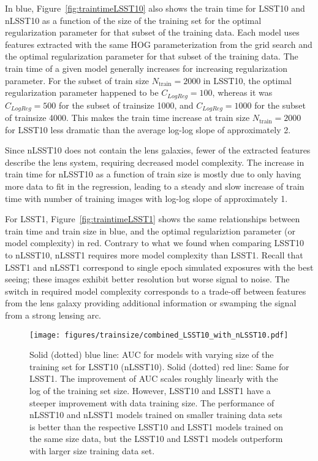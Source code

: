 \documentclass{emulateapj}
\begin{document}
In blue, Figure~\ref{fig:traintimeLSST10} also shows the train time
for LSST10 and nLSST10 as a function of the size of the training set
for the optimal regularization parameter for that subset of the
training data.  Each model uses features extracted with the same HOG
parameterization from the grid search and the optimal regularization
parameter for that subset of the training data.  The train time of a
given model generally increases for increasing regularization
parameter.  For the subset of train size $N_\text{train}=2000$ in
LSST10, the optimal regularization parameter happened to be
$C_{LogReg}=100$, whereas it was $C_{LogReg}=500$ for the subset of
trainsize 1000, and $C_{LogReg}=1000$ for the subset of trainsize
4000.  This makes the train time increase at train size
$N_\text{train}=2000$ for LSST10 less dramatic than the average
log-log slope of approximately 2.

Since nLSST10 does not contain the lens galaxies, fewer of the
extracted features describe the lens system, requiring decreased model
complexity.  The increase in train time for nLSST10 as a function of
train size is mostly due to only having more data to fit in the
regression, leading to a steady and slow increase of train time with
number of training images with log-log slope of approximately 1.

For LSST1, Figure~\ref{fig:traintimeLSST1} shows the same
relationships between train time and train size in blue, and the
optimal regulariztion parameter (or model complexity) in red.
Contrary to what we found when comparing LSST10 to nLSST10, nLSST1
requires more model complexity than LSST1.  Recall that LSST1 and
nLSST1 correspond to single epoch simulated exposures with the best
seeing; these images exhibit better resolution but worse signal to
noise.  The switch in required model complexity corresponds to a
trade-off between features from the lens galaxy providing additional
information or swamping the signal from a strong lensing arc.

\begin{figure}[t]
\begin{center}
\texttt{[image: figures/trainsize/combined\_LSST10\_with\_nLSST10.pdf]}
\caption{Solid (dotted) blue line: AUC for models with varying size of
  the training set for LSST10 (nLSST10).  Solid (dotted) red line:
  Same for LSST1. The improvement of AUC scales roughly linearly with
  the log of the training set size.  However, LSST10 and LSST1 have a
  steeper improvement with data training size.  The performance of
  nLSST10 and nLSST1 models trained on smaller training data sets is
  better than the respective LSST10 and LSST1 models trained on the
  same size data, but the LSST10 and LSST1 models outperform with
  larger size training data set.}\label{fig:trainsizeLSST}
\end{center}
\end{figure}
\end{document}
